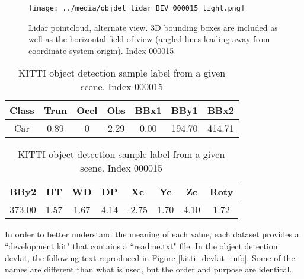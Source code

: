 \begin{figure}[H]
    \texttt{[image: ../media/objdet\_lidar\_BEV\_000015\_light.png]}
    \caption{Lidar pointcloud, alternate view. 3D bounding boxes are included as well as the horizontal field of view (angled lines leading away from coordinate system origin). Index 000015}
    \label{objdet_lidar_sample}
\end{figure}

\def \DEG{$^{\circ}$} %

\begin{table}[H]
	\centering
	\caption{KITTI object detection sample label from a given scene. Index 000015}
	\footnotesize
\begin{tabular}{|c|c|c|c|c|c|c|}
	\hline
	Class & Trun & Occl & Obs  & BBx1  & BBy1   & BBx2  \\
	\hline
	Car   & 0.89       & 0         & 2.29 & 0.00  & 194.70 & 414.71 \\
	\hline
\end{tabular}
\begin{tabular}{|c|c|c|c|c|c|c|c|}
	\hline
	BBy2   & HT   & WD   & DP   & Xc    & Yc   & Zc   & Roty \\
	\hline
	373.00 & 1.57 & 1.67 & 4.14 & -2.75 & 1.70 & 4.10 & 1.72 \\
	\hline
\end{tabular}
\label{kitti_label_sample}
\end{table}

In order to better understand the meaning of each value, each dataset provides a ``development kit" that contains a ``readme.txt" file. In the object detection devkit, the following text reproduced in Figure \ref{kitti_devkit_info}. Some of the names are different than what is used, but the order and purpose are identical.

